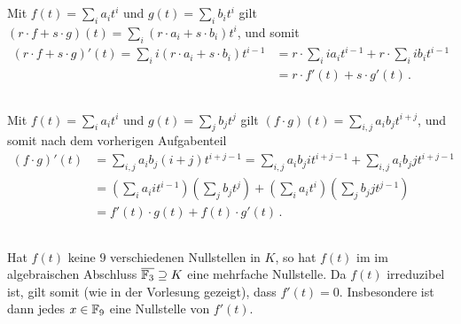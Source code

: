 \section{}





\subsection{}

Mit $f(t) = \sum_i a_i t^i$ und $g(t) = \sum_i b_i t^i$ gilt $(r \cdot f + s \cdot g)(t) = \sum_i (r \cdot a_i + s \cdot b_i) t^i$, und somit
\begin{align*}
      (r \cdot f + s \cdot g)'(t)
   =  \sum_i i (r \cdot a_i + s \cdot b_i) t^{i-1}
  &=  r \cdot \sum_i i a_i t^{i-1} + r \cdot \sum_i i b_i t^{i-1}
  \\
  &=  r \cdot f'(t) + s \cdot g'(t) \,.
\end{align*}





\subsection{}

Mit $f(t) = \sum_i a_i t^i$ und $g(t) = \sum_j b_j t^j$ gilt $(f \cdot g)(t) = \sum_{i,j} a_i b_j t^{i+j}$, und somit nach dem vorherigen Aufgabenteil
\begin{align*}
      (f \cdot g)'(t)
  &=  \sum_{i,j} a_i b_j (i+j) t^{i+j-1}
   =  \sum_{i,j} a_i b_j i t^{i+j-1}
    + \sum_{i,j} a_i b_j j t^{i+j-1}
  \\
  &=  \left( \sum_i a_i i t^{i-1} \right) \left( \sum_j b_j t^j \right)
    + \left( \sum_i a_i t^i \right) \left( \sum_j b_j j t^{j-1} \right)
  \\
  &= f'(t) \cdot g(t) + f(t) \cdot g'(t) \,.
\end{align*}





\subsection{}

Hat $f(t)$ keine $9$ verschiedenen Nullstellen in $K$, so hat $f(t)$ im im algebraischen Abschluss $\overline{\mathbb{F}_{3}} \supseteq K$ eine mehrfache Nullstelle.
Da $f(t)$ irreduzibel ist, gilt somit (wie in der Vorlesung gezeigt), dass $f'(t) = 0$.
Insbesondere ist dann jedes $x \in \mathbb{F}_{9}$ eine Nullstelle von $f'(t)$.





